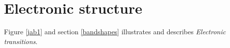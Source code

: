 \documentclass[a4paper,titlepage]{article}
\begin{document}
%
%
%
%
%
%


\section{Electronic structure}
Figure \ref{jab1} and section \ref{bandshapes} illustrates and describes \textit{Electronic transitions}.
\end{document}
